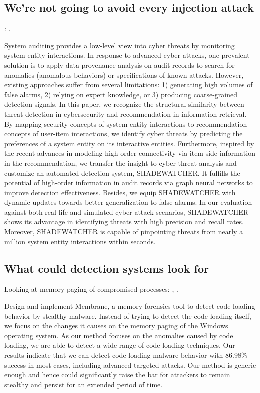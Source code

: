 \documentclass{article}
\begin{document}
\subsection{We're not going to avoid every injection attack}

\textbf{}: \textcite{Zengy:2022}.

System auditing provides a low-level view into cyber threats by monitoring system entity interactions. In response to advanced cyber-attacks, one prevalent solution is to apply data provenance analysis on audit records to search for anomalies (anomalous behaviors) or specifications of known attacks. However, existing approaches suffer from several limitations: 1) generating high volumes of false alarms, 2) relying on expert knowledge, or 3) producing coarse-grained detection signals. In this paper, we recognize the structural similarity between threat detection in cybersecurity and recommendation in information retrieval. By mapping security concepts of system entity interactions to recommendation concepts of user-item interactions, we identify cyber threats by predicting the preferences of a system entity on its interactive entities. Furthermore, inspired by the recent advances in modeling high-order connectivity via item side information in the recommendation, we transfer the insight to cyber threat analysis and customize an automated detection system, SHADEWATCHER. It fulfills the potential of high-order information in audit records via graph neural networks to improve detection effectiveness. Besides, we equip SHADEWATCHER with dynamic updates towards better generalization to false alarms. In our evaluation against both real-life and simulated cyber-attack scenarios, SHADEWATCHER shows its advantage in identifying threats with high precision and recall rates. Moreover, SHADEWATCHER is capable of pinpointing threats from nearly a million system entity interactions within seconds.


\subsection{What could detection systems look for}

Looking at memory paging of compromised processes: , \autocite{Pek:2016}.

Design and implement Membrane, a memory forensics tool to detect code loading behavior by stealthy malware. Instead of trying to detect the code loading itself, we focus on the changes it causes on the memory paging of the Windows operating system. As our method focuses on the anomalies caused by code loading, we are able to detect a wide range of code loading techniques. Our results indicate that we can detect code loading malware behavior with 86.98\% success in most cases, including advanced targeted attacks. Our method is generic enough and hence could significantly raise the bar for attackers to remain stealthy and persist for an extended period of time.
\end{document}
